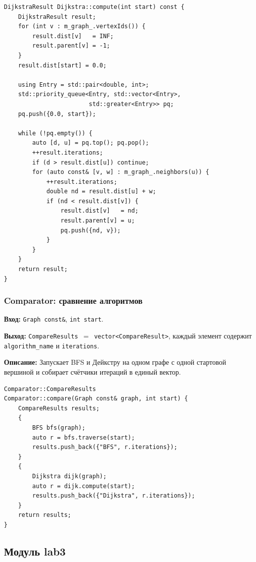 \begin{lstlisting}[style=cppstyle, caption={Алгоритм Дейкстры (Dijkstra.cc)}]
DijkstraResult Dijkstra::compute(int start) const {
    DijkstraResult result;
    for (int v : m_graph_.vertexIds()) {
        result.dist[v]   = INF;
        result.parent[v] = -1;
    }
    result.dist[start] = 0.0;

    using Entry = std::pair<double, int>;
    std::priority_queue<Entry, std::vector<Entry>,
                        std::greater<Entry>> pq;
    pq.push({0.0, start});

    while (!pq.empty()) {
        auto [d, u] = pq.top(); pq.pop();
        ++result.iterations;
        if (d > result.dist[u]) continue;
        for (auto const& [v, w] : m_graph_.neighbors(u)) {
            ++result.iterations;
            double nd = result.dist[u] + w;
            if (nd < result.dist[v]) {
                result.dist[v]   = nd;
                result.parent[v] = u;
                pq.push({nd, v});
            }
        }
    }
    return result;
}
\end{lstlisting}

\subsubsection{Comparator: сравнение алгоритмов}

\textbf{Вход:} \texttt{Graph const\&}, \texttt{int start}.

\textbf{Выход:} \texttt{CompareResults}~$=$~\texttt{vector<CompareResult>},
каждый элемент содержит \texttt{algorithm\_name} и \texttt{iterations}.

\textbf{Описание:} Запускает BFS и Дейкстру на одном графе с одной
стартовой вершиной и собирает счётчики итераций в единый вектор.

\begin{lstlisting}[style=cppstyle, caption={Сравнение алгоритмов (Comparator.cc)}]
Comparator::CompareResults
Comparator::compare(Graph const& graph, int start) {
    CompareResults results;
    {
        BFS bfs(graph);
        auto r = bfs.traverse(start);
        results.push_back({"BFS", r.iterations});
    }
    {
        Dijkstra dijk(graph);
        auto r = dijk.compute(start);
        results.push_back({"Dijkstra", r.iterations});
    }
    return results;
}
\end{lstlisting}

\subsection{Модуль lab3}

